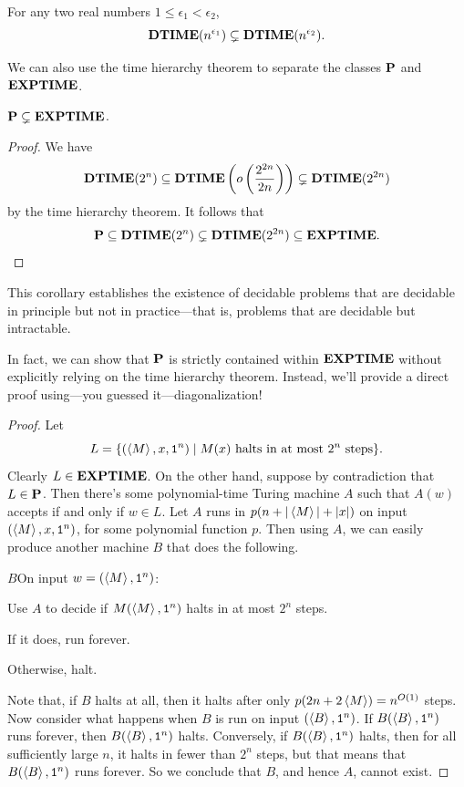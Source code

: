 \begin{corollary}
  For any two real numbers $1 \leq \epsilon_1 < \epsilon_2$,
  \[ \textbf{DTIME}(n^{\epsilon_1}) \subsetneq \textbf{DTIME}(n^{\epsilon_2}). \]
\end{corollary}

We can also use the time hierarchy theorem to separate the classes $\textbf{P}$ and $\textbf{EXPTIME}$.

\begin{corollary}
  $\textbf{P} \subsetneq \textbf{EXPTIME}$.
\end{corollary}

\begin{proof}
  We have
  \[ \textbf{DTIME}(2^n) \subseteq \textbf{DTIME}\left(o\left(\frac{2^{2n}}{2n}\right)\right) \subsetneq \textbf{DTIME}(2^{2n}) \]
  by the time hierarchy theorem. It follows that
  \[ \textbf{P} \subseteq \textbf{DTIME}(2^n) \subsetneq \textbf{DTIME}(2^{2n}) \subseteq \textbf{EXPTIME}. \]
\end{proof}

This corollary establishes the existence of decidable problems that are decidable in principle but not in practice—that is, problems that are decidable but intractable.

\begin{remark}
  In fact, we can show that $\textbf{P}$ is strictly contained within $\textbf{EXPTIME}$ without explicitly relying on the time hierarchy theorem. Instead, we'll provide a direct proof using—you guessed it—diagonalization!

  \begin{proof}
    Let
    \[ L = \{ (\left< M \right>, x, \texttt{1}^n) \mid \text{$M(x)$ halts in at most $2^n$ steps} \}. \]
    Clearly $L \in \textbf{EXPTIME}$. On the other hand, suppose by contradiction that $L \in \textbf{P}$. Then there's some polynomial-time Turing machine $A$ such that $A(w)$ accepts if and only if $w \in L$. Let $A$ runs in $p(n + | \left< M \right> | + | x |)$ on input $(\left< M \right>, x, \texttt{1}^n)$, for some polynomial function $p$. Then using $A$, we can easily produce another machine $B$ that does the following.

    \begin{turing}{$B$}{On input $w = (\left< M \right>, \texttt{1}^n)$:}
    \item Use $A$ to decide if $M(\left< M \right>, \texttt{1}^n)$ halts in at most $2^n$ steps.
    \item If it does, run forever.
    \item Otherwise, halt.
    \end{turing}

    Note that, if $B$ halts at all, then it halts after only $p(2n + 2 \left< M \right>) = n^{O(1)}$ steps. Now consider what happens when $B$ is run on input $(\left< B \right>, \texttt{1}^n)$. If $B(\left< B \right>, \texttt{1}^n)$ runs forever, then $B(\left< B \right>, \texttt{1}^n)$ halts. Conversely, if $B(\left< B \right>, \texttt{1}^n)$ halts, then for all sufficiently large $n$, it halts in fewer than $2^n$ steps, but that means that $B(\left< B \right>, \texttt{1}^n)$ runs forever. So we conclude that $B$, and hence $A$, cannot exist.
  \end{proof}
\end{remark}

